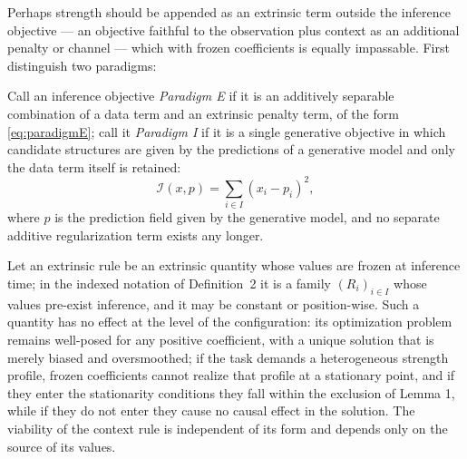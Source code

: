 Perhaps strength should be appended as an extrinsic term outside the inference objective --- an objective faithful to the observation plus context as an additional penalty or channel --- which with frozen coefficients is equally impassable. First distinguish two paradigms:

\begin{defn}
Call an inference objective \emph{Paradigm E} if it is an additively separable combination of a data term and an extrinsic penalty term, of the form \eqref{eq:paradigmE}; call it \emph{Paradigm I} if it is a single generative objective in which candidate structures are given by the predictions of a generative model and only the data term itself is retained:
\begin{equation}
\mathcal{I}(x, p) = \sum_{i \in I} (x_i - p_i)^2,
\label{eq:paradigmI}
\end{equation}
where $p$ is the prediction field given by the generative model, and no separate additive regularization term exists any longer.
\end{defn}

\begin{lemma}
Let an extrinsic rule be an extrinsic quantity whose values are frozen at inference time; in the indexed notation of Definition~2 it is a family $(R_i)_{i \in I}$ whose values pre-exist inference, and it may be constant or position-wise. Such a quantity has no effect at the level of the configuration: its optimization problem remains well-posed for any positive coefficient, with a unique solution that is merely biased and oversmoothed; if the task demands a heterogeneous strength profile, frozen coefficients cannot realize that profile at a stationary point, and if they enter the stationarity conditions they fall within the exclusion of Lemma 1, while if they do not enter they cause no causal effect in the solution. The viability of the context rule is independent of its form and depends only on the source of its values.
\end{lemma}

